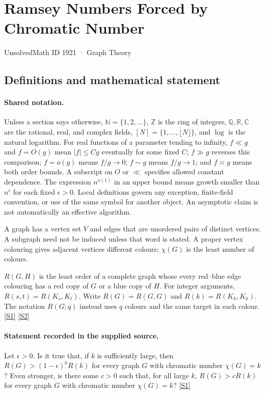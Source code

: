 \documentclass[11pt,a4paper]{article}
\newcommand{\N}{\mathbb{N}}
\newcommand{\Z}{\mathbb{Z}}
\newcommand{\Q}{\mathbb{Q}}
\newcommand{\R}{\mathbb{R}}
\newcommand{\C}{\mathbb{C}}
\newcommand{\sref}[2]{\hyperlink{source:#1:#2}{[S#2]}}
\begin{document}

\setcounter{section}{1920}

\section{Ramsey Numbers Forced by Chromatic Number}\label{1921}

{\small\sffamily UnsolvedMath ID 1921 · Graph Theory}

\subsection{Definitions and mathematical statement}

\paragraph{Shared notation.}Unless a section says otherwise, $\N=\{1,2,\ldots\}$,
$\Z$ is the ring of integers, $\Q,\R,\C$ are the rational, real, and complex
fields, $[N]=\{1,\ldots,\lfloor N\rfloor\}$, and $\log$ is the natural
logarithm. For real functions of a parameter tending to infinity,
$f\ll g$ and $f=O(g)$ mean $|f|\leq Cg$ eventually for some fixed $C$;
$f\gg g$ reverses this comparison; $f=o(g)$ means $f/g\to0$;
$f\sim g$ means $f/g\to1$; and $f\asymp g$ means both order bounds.
A subscript on $O$ or $\ll$ specifies allowed constant dependence.
The expression $n^{o(1)}$ in an upper bound means growth smaller than
$n^\epsilon$ for each fixed $\epsilon>0$. Local definitions govern any
exception, finite-field convention, or use of the same symbol for another
object. An asymptotic claim is not automatically an effective algorithm.



A graph has a vertex set $V$ and edges that are unordered pairs of distinct vertices. A subgraph need not be induced unless that word is stated. A proper vertex colouring gives adjacent vertices different colours; $\chi(G)$ is the least number of colours.

$R(G,H)$ is the least order of a complete graph whose every red--blue edge colouring has a red copy of $G$ or a blue copy of $H$. For integer arguments, $R(s,t)=R(K_s,K_t)$. Write $R(G)=R(G,G)$ and $R(k)=R(K_k,K_k)$. The notation $R(G;q)$ instead uses $q$ colours and the same target in each colour. \sref{1921}{1} \sref{1921}{2}

\paragraph{Statement recorded in the supplied source.}
Let $\epsilon >0$. Is it true that, if $k$ is sufficiently large, then $ R(G)>(1-\epsilon)^kR(k) $ for every graph $G$ with chromatic number $\chi(G)=k$?
Even stronger, is there some $c>0$ such that, for all large $k$, $R(G)>cR(k)$ for every graph $G$ with chromatic number $\chi(G)=k$? \sref{1921}{1}
\end{document}
